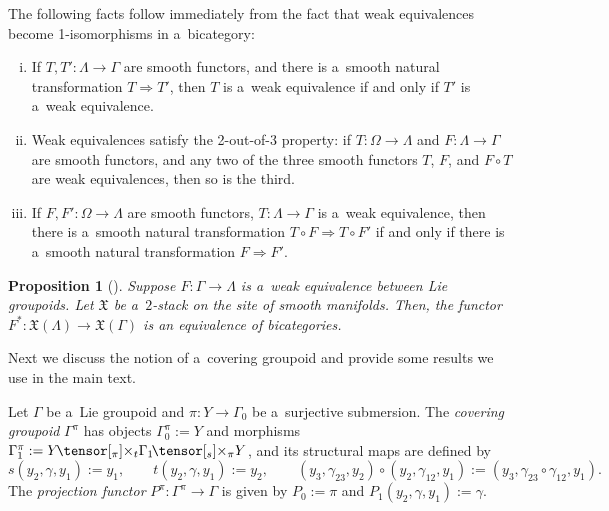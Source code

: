 \documentclass[pdftex]{sigma}
\numberwithin{equation}{section}
\newtheorem{Proposition}[Theorem]{Proposition}
 { \theoremstyle{definition}
\newtheorem{Definition}[Theorem]{Definition}
\newtheorem{Example}[Theorem]{Example}
\newtheorem{Remark}[Theorem]{Remark} }
\def\ttimes#1#2{\hspace{-0.15em}\tensor[_{#1}]{\times}{_{#2}}}
\begin{document}
\begin{Remark}
\label{Lemma: facts about weak equivalences}
The following facts follow immediately from the fact that weak equivalences become 1-isomorphisms in a~bicategory:
 \begin{enumerate}[(i)]\itemsep=0pt
 \item If $T,T'\colon \Lambda \to \Gamma$ are smooth functors, and there is a~smooth natural transformation $T \Rightarrow T'$, then
 $T$ is a~weak equivalence if and only if $T'$ is a~weak equivalence.
 \item\label{2-out-of-3}
 Weak equivalences satisfy the 2-out-of-3 property: if $T \colon \Omega \to \Lambda$ and $F\colon \Lambda \to \Gamma$ are smooth functors,
 and any two of the three smooth functors $T$, $F$, and $F \circ T$ are weak equivalences, then so is the third.
 \item \label{Weak equivalence filling} If $F,F' \colon \Omega \to \Lambda$ are smooth functors, $T \colon \Lambda \to \Gamma$ is a~weak equivalence, then there is a~smooth natural transformation
 $T \circ F \Rightarrow T \circ F'$ if and only if there is a~smooth natural transformation $F \Rightarrow F'$.
 \end{enumerate}
\end{Remark}


\begin{Proposition}[{\cite[Theorem 2.16]{nikolaus2}}] \label{Nikolaus-Schweigert weak equivalences}
 Suppose $F\colon \Gamma \to \Lambda$ is a~weak equivalence between Lie groupoids.
 Let $\mathfrak{X}$ be a~$2$-stack on the site of smooth manifolds. Then, the functor
$
F^{*}\colon \mathfrak{X}(\Lambda) \to \mathfrak{X}(\Gamma)
$
 is an equivalence of bicategories.
\end{Proposition}

Next we discuss the notion of a~covering groupoid and provide some results we use in the main text.

\begin{Definition}
\label{Example : covering groupoid and weak equivalences}
 Let $\Gamma$ be a~Lie groupoid and $\pi\colon Y \to \Gamma_0$ be a~surjective submersion. The
 \emph{covering groupoid} $\Gamma^\pi$ has objects $\Gamma^\pi_0 := Y$ and morphisms $\Gamma^\pi_1 := Y \ttimes\pi t \Gamma_1 \ttimes s\pi Y$, and its structural maps are defined by
\begin{equation*}
s(y_2,\gamma,y_1):= y_1
,\qquad
t(y_2,\gamma,y_1) := y_2
,\qquad
(y_3,\gamma_{23},y_2) \circ (y_2,\gamma_{12},y_1) := (y_3,\gamma_{23} \circ \gamma_{12},y_1).
\end{equation*}
The \emph{projection functor} $P^{\pi}\colon \Gamma^{\pi} \to \Gamma$ is given by $P_0 :=\pi$ and $P_1(y_2,\gamma,y_1) := \gamma$.
\end{Definition}
\end{document}
